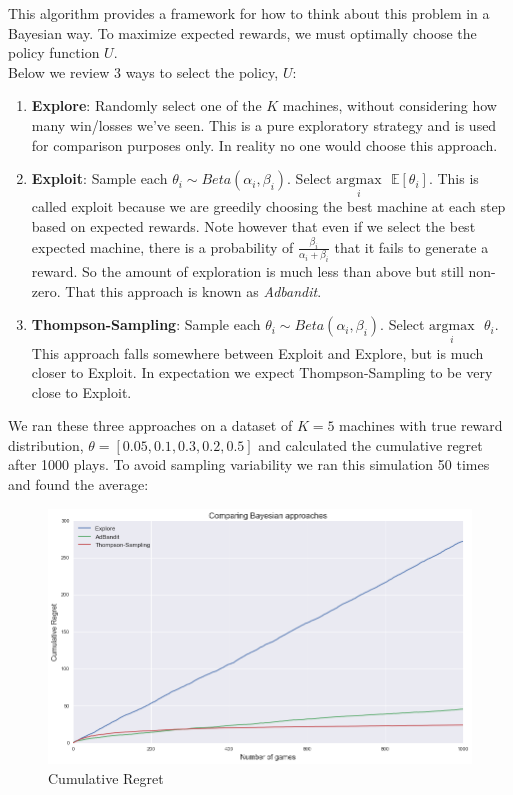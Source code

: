\documentclass{article}
\begin{document}
This algorithm provides a framework for how to think about this problem in a Bayesian way. To maximize expected rewards, we must optimally choose the policy function $U$.\\

Below we review 3 ways to select the policy, $U$:

\begin{enumerate}
\item \textbf{Explore}: Randomly select one of the $K$ machines, without considering how many win/losses we've seen. This is a pure exploratory strategy and is used for comparison purposes only. In reality no one would choose this approach.
\item \textbf{Exploit}: Sample each $\theta_i \sim Beta(\alpha_i, \beta_i)$. Select $\underset{i}{\text{argmax}}\text{ }\mathbb{E}[\theta_i]$. This is called exploit because we are greedily choosing the best machine at each step based on expected rewards. Note however that even if we select the best expected machine, there is a probability of $\frac{\beta_i}{\alpha_i + \beta_i}$ that it fails to generate a reward. So the amount of exploration is much less than above but still non-zero. That this approach is known as \textit{Adbandit}.
\item \textbf{Thompson-Sampling}: Sample each $\theta_i \sim Beta(\alpha_i, \beta_i)$. Select $\underset{i}{\text{argmax}}\text{ }\theta_i$. This approach falls somewhere between Exploit and Explore, but is much closer to Exploit. In expectation we expect Thompson-Sampling to be very close to Exploit.
\end{enumerate}

We ran these three approaches on a dataset of $K=5$ machines with true reward distribution, $\theta = [0.05,0.1,0.3,0.2,0.5]$ and calculated the cumulative regret after 1000 plays. To avoid sampling variability we ran this simulation 50 times and found the average:

\begin{figure}[H]
\centering
\includegraphics[scale=0.4]{thompson_regret.png}
\caption{Cumulative Regret}
\end{figure}
\end{document}
